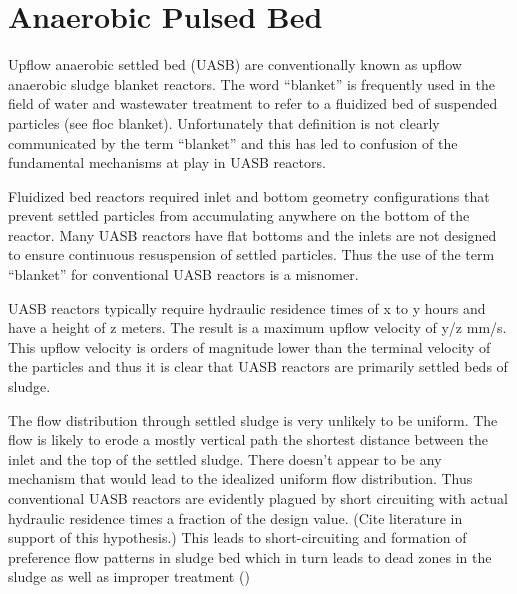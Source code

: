 \documentclass[letterpaper,10pt,english]{sphinxmanual}
\begin{document}
\section{Anaerobic Pulsed Bed}
\label{\detokenize{WasteWater/WW_Theory_and_Future_Work:anaerobic-pulsed-bed}}\label{\detokenize{WasteWater/WW_Theory_and_Future_Work:heading-uasb}}
Upflow anaerobic settled bed (UASB) are conventionally known as upflow anaerobic sludge blanket reactors. The word “blanket” is frequently used in the field of water and wastewater treatment to refer to a fluidized bed of suspended particles (see floc blanket). Unfortunately that definition is not clearly communicated by the term “blanket” and this has led to confusion of the fundamental mechanisms at play in UASB reactors.

Fluidized bed reactors required inlet and bottom geometry configurations that prevent settled particles from accumulating anywhere on the bottom of the reactor. Many UASB reactors have flat bottoms and the inlets are not designed to ensure continuous resuspension of settled particles. Thus the use of the term  “blanket” for conventional UASB reactors is a misnomer.

UASB reactors typically require hydraulic residence times of x to y hours and have a height of z meters. The result is a maximum upflow velocity of y/z mm/s. This upflow velocity is orders of magnitude lower than the terminal velocity of the particles and thus it is clear that UASB reactors are primarily settled beds of sludge.

The flow distribution through settled sludge is very unlikely to be uniform. The flow is likely to erode a mostly vertical path the shortest distance between the inlet and the top of the settled sludge. There doesn’t appear to be any mechanism that would lead to the idealized uniform flow distribution. Thus conventional UASB reactors are evidently plagued by short circuiting with actual hydraulic residence times a fraction of the design value. (Cite literature in support of this hypothesis.) This leads to short-circuiting and formation of preference flow patterns in sludge bed which in turn leads to dead zones in the sludge as well as improper treatment ()
\end{document}
